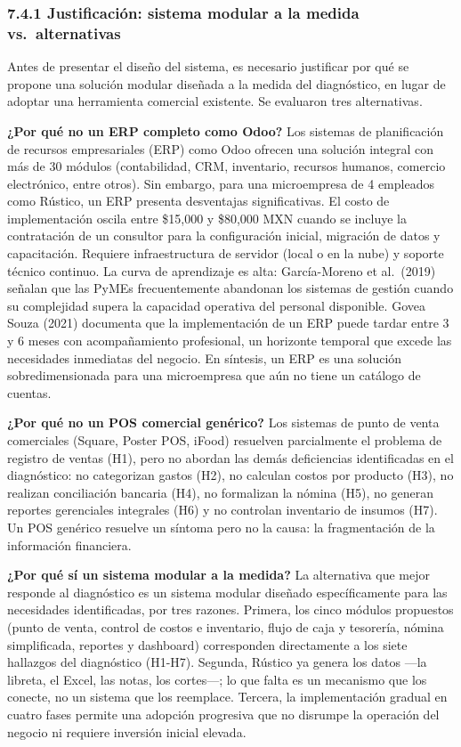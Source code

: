 \documentclass[
  12pt,
  spanish,
]{article}
\begin{document}
\hypertarget{justificaciuxf3n-sistema-modular-a-la-medida-vs.-alternativas}{%
\subsubsection{7.4.1 Justificación: sistema modular a la medida
vs.~alternativas}\label{justificaciuxf3n-sistema-modular-a-la-medida-vs.-alternativas}}

Antes de presentar el diseño del sistema, es necesario justificar por
qué se propone una solución modular diseñada a la medida del
diagnóstico, en lugar de adoptar una herramienta comercial existente. Se
evaluaron tres alternativas.

\textbf{¿Por qué no un ERP completo como Odoo?} Los sistemas de
planificación de recursos empresariales (ERP) como Odoo ofrecen una
solución integral con más de 30 módulos (contabilidad, CRM, inventario,
recursos humanos, comercio electrónico, entre otros). Sin embargo, para
una microempresa de 4 empleados como Rústico, un ERP presenta
desventajas significativas. El costo de implementación oscila entre
\$15,000 y \$80,000 MXN cuando se incluye la contratación de un
consultor para la configuración inicial, migración de datos y
capacitación. Requiere infraestructura de servidor (local o en la nube)
y soporte técnico continuo. La curva de aprendizaje es alta:
García-Moreno et al.~(2019) señalan que las PyMEs frecuentemente
abandonan los sistemas de gestión cuando su complejidad supera la
capacidad operativa del personal disponible. Govea Souza (2021)
documenta que la implementación de un ERP puede tardar entre 3 y 6 meses
con acompañamiento profesional, un horizonte temporal que excede las
necesidades inmediatas del negocio. En síntesis, un ERP es una solución
sobredimensionada para una microempresa que aún no tiene un catálogo de
cuentas.

\textbf{¿Por qué no un POS comercial genérico?} Los sistemas de punto de
venta comerciales (Square, Poster POS, iFood) resuelven parcialmente el
problema de registro de ventas (H1), pero no abordan las demás
deficiencias identificadas en el diagnóstico: no categorizan gastos
(H2), no calculan costos por producto (H3), no realizan conciliación
bancaria (H4), no formalizan la nómina (H5), no generan reportes
gerenciales integrales (H6) y no controlan inventario de insumos (H7).
Un POS genérico resuelve un síntoma pero no la causa: la fragmentación
de la información financiera.

\textbf{¿Por qué sí un sistema modular a la medida?} La alternativa que
mejor responde al diagnóstico es un sistema modular diseñado
específicamente para las necesidades identificadas, por tres razones.
Primera, los cinco módulos propuestos (punto de venta, control de costos
e inventario, flujo de caja y tesorería, nómina simplificada, reportes y
dashboard) corresponden directamente a los siete hallazgos del
diagnóstico (H1-H7). Segunda, Rústico ya genera los datos ---la libreta,
el Excel, las notas, los cortes---; lo que falta es un mecanismo que los
conecte, no un sistema que los reemplace. Tercera, la implementación
gradual en cuatro fases permite una adopción progresiva que no disrumpe
la operación del negocio ni requiere inversión inicial elevada.
\end{document}
